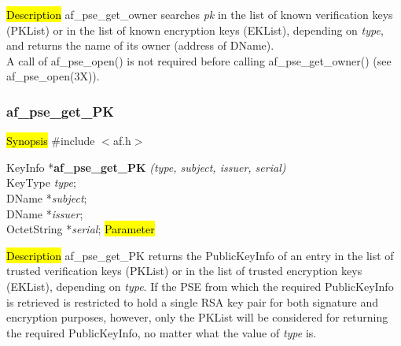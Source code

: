 
\hl{Description}
af\_pse\_get\_owner searches {\em pk} in the list of known 
verification keys (PKList) or in the list of known encryption keys (EKList), depending
on {\em type}, and returns the name of its owner (address of DName).
\\ [1em]
A call of af\_pse\_open() is not required before calling af\_pse\_get\_owner()
(see af\_pse\_open(3X)).

\subsubsection{af\_pse\_get\_PK}
\label{af_search_Name}
\hl{Synopsis}
\#include $<$af.h$>$

KeyInfo *{\bf af\_pse\_get\_PK} {\em (type, subject, issuer, serial)} \\
KeyType {\em type}; \\
DName *{\em subject}; \\
DName *{\em issuer}; \\
OctetString *{\em serial};
\hl{Parameter}




\hl{Description}
af\_pse\_get\_PK returns the PublicKeyInfo of an entry in the list of trusted 
verification keys (PKList) or in the list of trusted encryption keys (EKList), depending
on {\em type}.
If the PSE from which the required PublicKeyInfo is retrieved is restricted to hold a single RSA key pair
for both signature and encryption purposes, however, only the PKList will be considered for returning the required PublicKeyInfo,
no matter what the value of {\em type} is.

